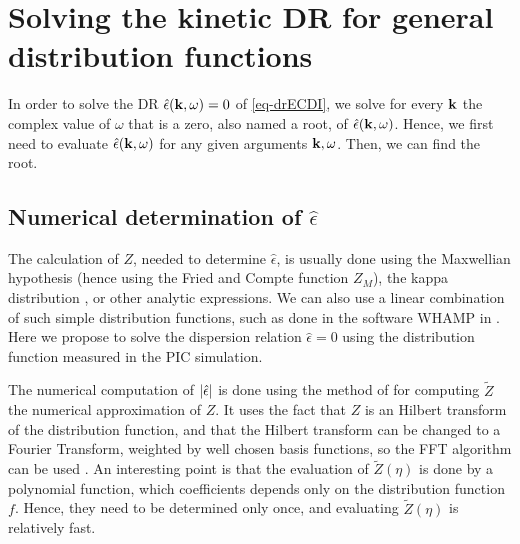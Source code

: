 
\section{Solving the kinetic \acs{DR} for general distribution functions}
  \label{sec-DR-solver}


  In order to solve the \ac{DR}  $\hat\epsilon({\mathbf k}, \omega) = 0$ of \cref{eq-drECDI}, we solve for every ${\mathbf k}$ the complex value of $\omega$ that is a zero, also named a root, of $\hat\epsilon({\mathbf k}, \omega)$.
  Hence, we first need to evaluate $\hat\epsilon({\mathbf k}, \omega)$ for any given arguments ${\mathbf k}, \omega$.
  Then, we can find the root.
  

  \subsection{Numerical determination of \texorpdfstring{$\hat\epsilon$}{the plasma dielectric function.}} \label{subsec-numepsilon}
  
  The calculation of $Z$, needed to determine $\hat{\epsilon}$, is usually done using the Maxwellian hypothesis \citep{cavalier2013} (hence using the Fried and Compte function $Z_M$), the kappa distribution \citep{ziebell2017}, or other analytic expressions.
  We can also use a linear combination of such simple distribution functions, such as done in the software WHAMP in \citet{ronnmark1982}.
  Here we propose to solve the dispersion relation $\hat{\epsilon}=0$ using the distribution function measured in the \ac{PIC} simulation.
  
  The numerical computation of $\lvert\hat\epsilon\rvert$ is done using the method of \citet{xie2013} for computing $\tilde{Z}$ the numerical approximation of $Z$. 
  It uses the fact that $Z$ is an Hilbert transform of the distribution function, and that the Hilbert transform can be changed to a Fourier Transform, weighted by well chosen basis functions, so the \ac{FFT} algorithm can be used \citep{weideman1995}.
  An interesting point is that the evaluation of $\tilde{Z}(\eta)$ is done by a polynomial function, which coefficients depends only on the distribution function $f$. 
  Hence, they need to be determined only once, and evaluating $\tilde{Z}(\eta)$ is relatively fast.
  
